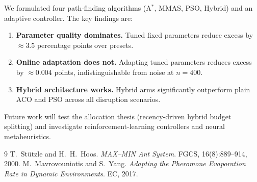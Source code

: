 \documentclass[11pt,a4paper]{article}
\theoremstyle{definition}
\begin{document}
We formulated four path-finding algorithms (A$^*$, MMAS, PSO, Hybrid) and an adaptive
controller. The key findings are:

\begin{enumerate}[label=(\arabic*)]
  \item \textbf{Parameter quality dominates.} Tuned fixed parameters reduce excess by
        $\approx 3.5$ percentage points over presets.
  \item \textbf{Online adaptation does not.} Adapting tuned parameters reduces excess
        by $\approx 0.004$ points, indistinguishable from noise at $n=400$.
  \item \textbf{Hybrid architecture works.} Hybrid arms significantly outperform plain
        ACO and PSO across all disruption scenarios.
\end{enumerate}

Future work will test the allocation thesis (recency-driven hybrid budget splitting) and
investigate reinforcement-learning controllers and neural metaheuristics.

\begin{thebibliography}{9}
 T.~Stützle and H.~H.~Hoos. \emph{MAX--MIN Ant System}. FGCS, 16(8):889--914, 2000.
 M.~Mavrovouniotis and S.~Yang. \emph{Adapting the Pheromone Evaporation Rate in Dynamic Environments}. EC, 2017.
\end{thebibliography}
\end{document}
